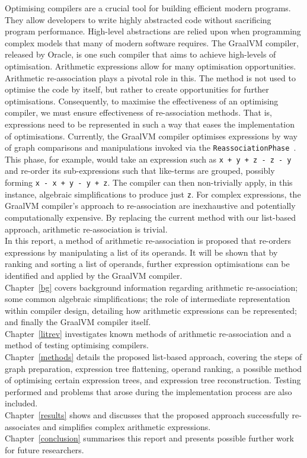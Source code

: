 \documentclass[12pt,openany,a4paper]{book}
\newcommand{\chap}[1] {Chapter~\ref{#1}}	%
\begin{document}
Optimising compilers are a crucial tool for building efficient 
modern programs. They allow developers to write highly abstracted code without 
sacrificing program performance. High-level abstractions are relied upon when
programming complex models that many of modern software requires. The GraalVM
compiler, released by Oracle, is one such compiler that aims to achieve 
high-levels of optimisation. Arithmetic expressions allow for many optimisation opportunities.
Arithmetic re-association plays a pivotal role in this. The method is not used
to optimise the code by itself, but rather to create opportunities for further
optimisations. Consequently, to maximise the effectiveness of an optimising
compiler, we must ensure effectiveness of re-association methods. That is,
expressions need to be represented in such a way that eases the implementation
of optimisations.
Currently, the GraalVM compiler optimises expressions by way 
of graph comparisons and manipulations invoked via the \verb|ReassociationPhase|~\cite{graalsrc}.
This phase, for example, would take an expression such as \verb|x + y + z - z - y| and
re-order its sub-expressions such that like-terms are grouped, possibly forming
\verb|x - x + y - y + z|. The compiler can then non-trivially apply, in this
instance, algebraic simplifications to produce just \verb|z|.
For complex expressions, the GraalVM compiler's approach to re-association are inexhaustive
and potentially computationally expensive. By replacing the current method with 
our list-based approach, arithmetic re-association is trivial. \\
In this report, a method of arithmetic re-association is proposed that re-orders
expressions by manipulating a list of its operands. It will be shown that by
ranking and sorting a list of operands, further expression optimisations
can be identified and applied by the GraalVM compiler. \\
\chap{bg} covers background information regarding arithmetic re-association;
some common algebraic simplifications; the role of intermediate representation
within compiler design, detailing how arithmetic expressions can be represented;
and finally the GraalVM compiler itself. \\
\chap{litrev} investigates known methods of arithmetic re-association and 
a method of testing optimising compilers. \\
\chap{methods} details the proposed list-based approach, covering the steps
of graph preparation, expression tree flattening, operand ranking, a possible 
method of optimising certain expression trees, and expression tree 
reconstruction. Testing performed and problems that
arose during the implementation process are also included. \\
\chap{results} shows and discusses that the proposed approach successfully
re-associates and simplifies complex arithmetic expressions. \\
\chap{conclusion} summarises this report and presents possible further work for 
future researchers.
\end{document}
